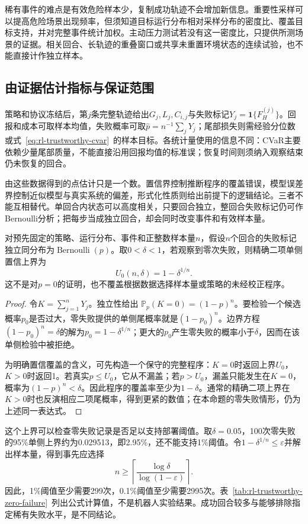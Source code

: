 稀有事件的难点是有效危险样本少，复制成功轨迹不会增加新信息。重要性采样可以提高危险场景出现频率，但须知道目标运行分布相对采样分布的密度比、覆盖目标支持，并对完整事件统计加权。主动压力测试若没有这一密度比，只提供所测场景的证据。相关回合、长轨迹的重叠窗口或共享未重置环境状态的连续试验，也不能直接计作独立样本。

\subsection{由证据估计指标与保证范围}
\label{sec:rl-trustworthy-inference}

策略和协议冻结后，第$j$条完整轨迹给出$G_j,L_j,C_{i,j}$与失败标记$Y_j=\mathbf1\{F_H^{(j)}\}$。回报和成本可取样本均值，失败概率可取$\widehat p=n^{-1}\sum_jY_j$；尾部损失则需经验分位数或式~\eqref{eq:rl-trustworthy-cvar}~的样本目标。各统计量使用的信息不同：CVaR主要依赖少量尾部质量，不能直接沿用回报均值的标准误；恢复时间则须纳入观察结束仍未恢复的回合。

由这些数据得到的点估计只是一个数。置信界控制推断程序的覆盖错误，模型误差界控制近似模型与真实系统的偏差，形式化性质则给出前提下的逻辑结论。三者不能互相替代。单回合内状态可以高度相关，只要回合独立，整回合失败标记仍可作Bernoulli分析；把每步当成独立回合，却会同时改变事件和有效样本量。

\begin{theorem}[零失败记录的单侧上界]
  \label{thm:rl-trustworthy-zero-failure}
  对预先固定的策略、运行分布、事件和正整数样本量$n$，假设$n$个回合的失败标记独立同分布为$\operatorname{Bernoulli}(p)$。取$0<\delta<1$，若观察到零次失败，则精确二项单侧置信上界为
  \[
    U_0(n,\delta)=1-\delta^{1/n}.
  \]
  这不是对$p=0$的证明，也不覆盖根据数据选择样本量或策略的未经校正程序。
\end{theorem}
\begin{proof}
  令$K=\sum_{j=1}^nY_j$。独立性给出
  $\mathbb P_p(K=0)=(1-p)^n$。要检验一个候选概率$p_0$是否过大，零失败提供的单侧尾概率就是$(1-p_0)^n$。边界方程
  $(1-p_0)^n=\delta$的解为$p_0=1-\delta^{1/n}$；更大的$p_0$产生零失败的概率小于$\delta$，因而在该单侧检验中被拒绝。

  为明确置信覆盖的含义，可先构造一个保守的完整程序：$K=0$时返回上界$U_0$，$K>0$时返回1。若真实$p\leq U_0$，它从不漏盖；若$p>U_0$，漏盖只能发生在$K=0$，概率为$(1-p)^n<\delta$。因此程序的覆盖率至少为$1-\delta$。通常的精确二项上界在$K>0$时也反演相应二项尾概率，得到更紧的数值；在本命题的零失败情形，仍为上述同一表达式。
\end{proof}

这个上界可以检查零失败记录是否足以支持部署阈值。取$\delta=0.05$，100次零失败的95\%单侧上界约为0.029513，即2.95\%，还不能支持1\%阈值。令$1-\delta^{1/n}\leq\varepsilon$并解出样本量，得到事先应选择
\[
  n\geq
  \left\lceil\frac{\log\delta}{\log(1-\varepsilon)}\right\rceil.
\]
因此，1\%阈值至少需要299次，0.1\%阈值至少需要2995次。表~\ref{tab:rl-trustworthy-zero-failure}~列出公式计算值，不是机器人实验结果。成功回合较多与能够排除指定稀有失败水平，是不同结论。

